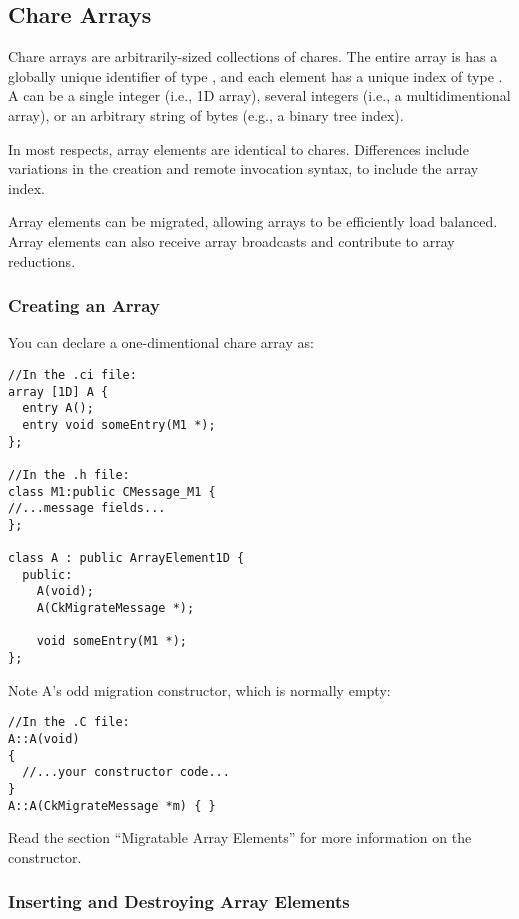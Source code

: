 \subsection{Chare Arrays}

Chare arrays  are arbitrarily-sized collections of chares.
The entire array is has a globally unique identifier of type 
, and each element has a unique index of type
.  A  can be a single integer (i.e., 1D
array), several integers (i.e., a multidimentional array), or 
an arbitrary string of bytes (e.g., a binary tree index).

In most respects, array elements are identical to chares.  Differences
include variations in the creation and remote invocation syntax, to
include the array index.  

Array elements can be migrated, allowing arrays to be efficiently
load balanced.  Array elements can also receive array broadcasts and
contribute to array reductions.

\subsubsection{Creating an Array}

You can declare a one-dimentional chare array
as:

\begin{verbatim}
//In the .ci file:
array [1D] A {
  entry A();
  entry void someEntry(M1 *);
};

//In the .h file:
class M1:public CMessage_M1 {
//...message fields...
};

class A : public ArrayElement1D {
  public:
    A(void);
    A(CkMigrateMessage *);

    void someEntry(M1 *);
};
\end{verbatim}

Note A's odd migration constructor, which is normally empty:

\begin{verbatim}
//In the .C file:
A::A(void)
{
  //...your constructor code...
}
A::A(CkMigrateMessage *m) { }
\end{verbatim}

Read the section ``Migratable Array Elements'' for more
information on the 
constructor. 


\subsubsection{Inserting and Destroying Array Elements}

